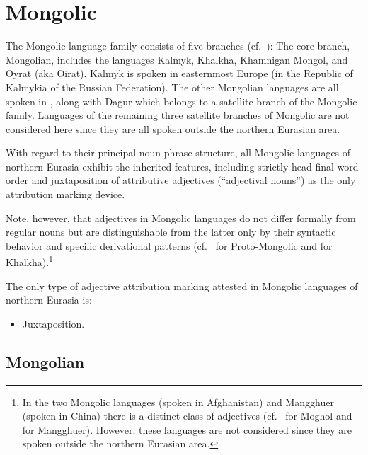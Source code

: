 \section{Mongolic}
The Mongolic language family consists of five branches (cf.~\citealt[222]{salminen2007}): The core branch, Mongolian, includes the languages Kalmyk, Khalkha, Khamnigan Mongol, and Oyrat (aka Oirat). Kalmyk is spoken in easternmost Europe (in the Republic of Kalmykia of the Russian Federation). The other Mongolian languages are all spoken in , along with Dagur which belongs to a satellite branch of the Mongolic family. Languages of the remaining three satellite branches of Mongolic are not considered here since they are all spoken outside the northern Eurasian area.

With regard to their principal noun phrase structure, all Mongolic languages of northern Eurasia exhibit the inherited  features, including strictly head-final word order and juxtaposition of attributive adjectives (“adjectival nouns”) as the only attribution marking device.

Note, however, that adjectives in Mongolic languages do not differ formally from regular nouns but are distinguishable from the latter only by their syntactic behavior and specific derivational patterns (cf.~\citealt[10]{janhunen2003b} for Proto-Mongolic and \citealt[161]{svantesson2003} for Khalkha).\footnote{In the two Mongolic languages  (spoken in Afghanistan) and Mangghuer (spoken in China) there is a distinct class of adjectives (cf.~\citealt[252]{weiers2003} for Moghol and \citealt[311]{slater2003} for Mangghuer). However, these languages are not considered since they are spoken outside the northern Eurasian area.}

The only type of adjective attribution marking attested in Mongolic languages of northern Eurasia is:
\begin{itemize}
\item Juxtaposition.
\end{itemize}

\subsection{Mongolian}

